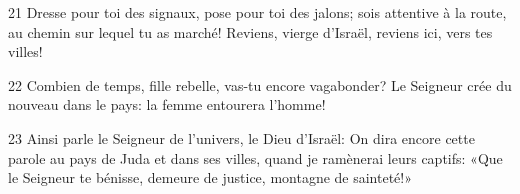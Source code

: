 
21 Dresse pour toi des signaux, pose pour toi des jalons; sois attentive à la route, au chemin sur lequel tu as marché! Reviens, vierge d’Israël, reviens ici, vers tes villes!

22 Combien de temps, fille rebelle, vas-tu encore vagabonder? Le Seigneur crée du nouveau dans le pays: la femme entourera l’homme!

23 Ainsi parle le Seigneur de l’univers, le Dieu d’Israël: On dira encore cette parole au pays de Juda et dans ses villes, quand je ramènerai leurs captifs: «Que le Seigneur te bénisse, demeure de justice, montagne de sainteté!»